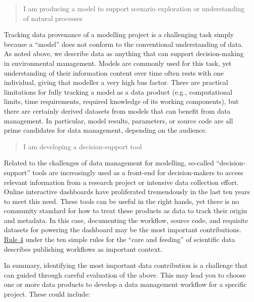 \documentclass[
]{book}
\begin{document}
\begin{quote}
I am producing a model to support scenario exploration or understanding of natural processes
\end{quote}

Tracking data provenance of a modelling project is a challenging task simply because a ``model'' does not conform to the conventional understanding of data. As noted above, we describe data as anything that can support decision-making in environmental management. Models are commonly used for this task, yet understanding of their information content over time often rests with one individual, giving that modeller a very high bus factor. There are practical limitations for fully tracking a model as a data product (e.g., computational limits, time requirements, required knowledge of its working components), but there are certainly derived datasets from models that can benefit from data management. In particular, model results, parameters, or source code are all prime candidates for data management, depending on the audience.

\begin{quote}
I am developing a decision-support tool
\end{quote}

Related to the challenges of data management for modelling, so-called ``decision-support'' tools are increasingly used as a front-end for decision-makers to access relevant information from a research project or intensive data collection effort. Online interactive dashboards have proliferated tremendously in the last ten years to meet this need. These tools can be useful in the right hands, yet there is no community standard for how to treat these products as data to track their origin and metadata. In this case, documenting the workflow, source code, and requisite datasets for powering the dashboard may be the most important contributions. \href{https://journals.plos.org/ploscompbiol/article?id=10.1371/journal.pcbi.1003542\#s4}{Rule 4} under the ten simple rules for the ``care and feeding'' of scientific data \citep{Goodman14} describes publishing workflows as important context.

In summary, identifying the most important data contribution is a challenge that can guided through careful evaluation of the above. This may lead you to choose one or more data products to develop a data management workflow for a specific project. These could include:
\end{document}
